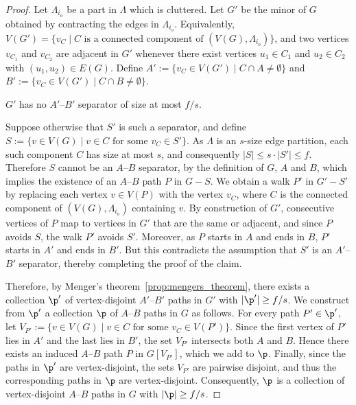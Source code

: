 \begin{proof}
    Let $\Lambda_{i_o}$ be a part in $\Lambda$ which is cluttered. Let $G'$ be the minor of $G$ obtained by contracting the edges in $\Lambda_{i_o}$. Equivalently, $V(G')=\{v_C \mid C \text{ is a connected component of } (V(G),\Lambda_{i_o})\}$, and two vertices $v_{C_1}$ and $v_{C_2}$ are adjacent in $G'$ whenever there exist vertices $u_1 \in C_1$ and $u_2 \in C_2$ with $(u_1,u_2) \in E(G)$. Define $A' := \{v_C \in V(G') \mid C \cap A \neq \emptyset\}$ and $B' := \{v_C \in V(G') \mid C \cap B \neq \emptyset\}$.

    \begin{claim}
        $G'$ has no $A'$--$B'$ separator of size at most $f/s$.
    \end{claim}
    \begin{claimproof}
        Suppose otherwise that $S'$ is such a separator, and define $S := \{v \in V(G) \mid v \in C \text{ for some } v_C \in S'\}$. As $\Lambda$ is an $s$-size edge partition, each such component $C$ has size at most $s$, and consequently $|S| \le s\cdot |S'| \le f$. Therefore $S$ cannot be an $A$--$B$ separator, by the definition of $G$, $A$ and $B$, which implies the existence of an $A$--$B$ path $P$ in $G - S$. 
        We obtain a walk $P'$ in $G'-S'$ by replacing each vertex $v \in V(P)$ with the vertex $v_C$, where $C$ is the connected component of $(V(G),\Lambda_{i_o})$ containing $v$. By construction of $G'$, consecutive vertices of $P$ map to vertices in $G'$ that are the same or adjacent, and since $P$ avoids $S$, the walk $P'$ avoids $S'$. Moreover, as $P$ starts in $A$ and ends in $B$, $P'$ starts in $A'$ and ends in $B'$. But this contradicts the assumption that $S'$ is an $A'$--$B'$ separator, thereby completing the proof of the claim. 
    \end{claimproof}

    Therefore, by Menger's theorem~\ref{prop:mengers_theorem}, there exists a collection $\p'$ of vertex-disjoint $A'$--$B'$ paths in $G'$ with $|\p'| \ge f/s$. We construct from $\p'$ a collection $\p$ of $A$--$B$ paths in $G$ as follows. For every path $P' \in \p'$, let $V_{P'} := \{v \in V(G) \mid v \in C \text{ for some } v_C \in V(P')\}$. Since the first vertex of $P'$ lies in $A'$ and the last lies in $B'$, the set $V_{P'}$ intersects both $A$ and $B$. Hence there exists an induced $A$--$B$ path $P$ in $G[V_{P'}]$, which we add to $\p$. Finally, since the paths in $\p'$ are vertex-disjoint, the sets $V_{P'}$ are pairwise disjoint, and thus the corresponding paths in $\p$ are vertex-disjoint. Consequently, $\p$ is a collection of vertex-disjoint $A$--$B$ paths in $G$ with $|\p| \ge f/s$.


\end{proof}
